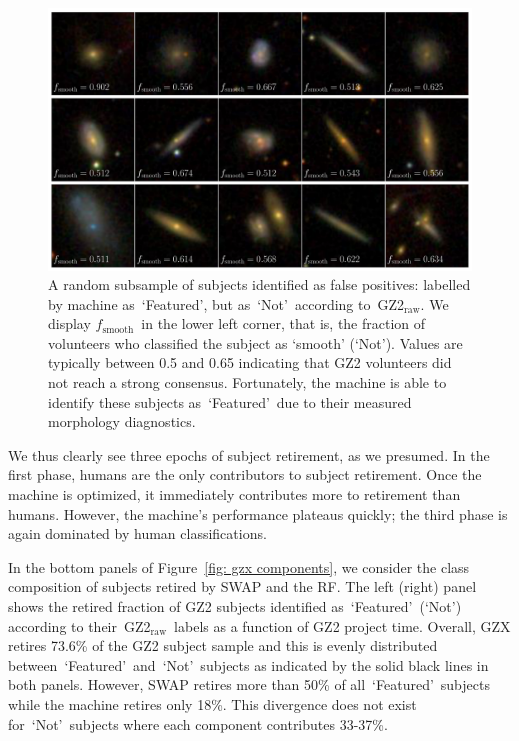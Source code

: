 \documentclass[twocolumn, trackchanges, linenumbers]{aastex6}%
\newcommand{\feat}{`Featured'}
\newcommand{\notfeat}{`Not'}
\newcommand{\raw}{GZ2$_{\text{raw}}$}
\newcommand{\fsmooth}{$f_{\mathrm{smooth}}$}
\begin{document}
\begin{figure}[t!]
\centering
\includegraphics[width=6.5in]{f9.pdf}
\caption{A random subsample of subjects identified as false positives: labelled by machine as~\feat, but as~\notfeat~according to~\raw. We display \fsmooth~in the lower left corner, that is, the fraction of volunteers who classified the subject as `smooth' (\notfeat). Values are typically between 0.5 and 0.65 indicating that GZ2 volunteers did not reach a strong consensus. Fortunately, the machine is able to identify these subjects as~\feat~due to their measured morphology diagnostics. \label{fig: machine false pos}}
\end{figure}

We thus clearly see three epochs of subject retirement, as we presumed.
In the first phase, humans are the only contributors to subject retirement.  
Once the machine is optimized, it immediately contributes more to retirement than humans.
However, the machine's performance plateaus quickly;  the third 
phase is again dominated by human classifications.

In the bottom panels of Figure~\ref{fig: gzx components}, we consider the class
composition of subjects retired by SWAP and the RF. 
The left (right) panel shows the retired fraction of GZ2 subjects identified 
as~\feat~(\notfeat) according to their~\raw~labels as a function of GZ2 project time. 
Overall, GZX retires 73.6\% of the GZ2 subject sample and this is evenly 
distributed between~\feat~and~\notfeat~subjects as indicated by the solid
black lines in both panels. 
However, SWAP retires more than 50\% of all~\feat~subjects while the machine
retires only 18\%. This divergence does not exist for~\notfeat~subjects where
each component contributes 33-37\%. 
\end{document}
